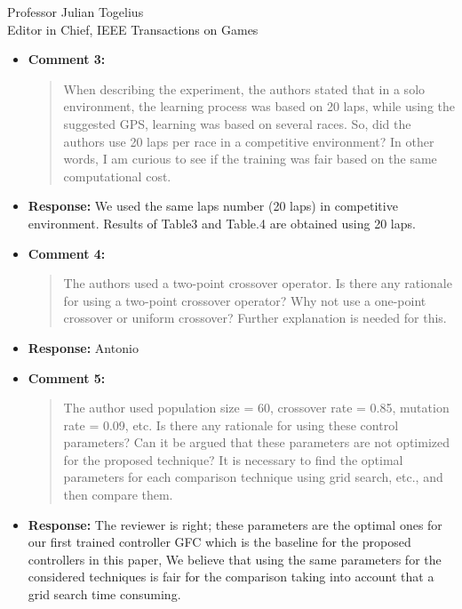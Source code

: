 \documentclass[10pt]{letter} %
\begin{document}
\begin{letter}{Professor Julian Togelius \\ Editor in Chief, IEEE Transactions on Games}
\begin{enumerate}
\begin{itemize}
\begin{itemize}
	\end{itemize}			
		\item {\bf Comment 3:}
		\begin{quote}
		When describing the experiment, the authors stated that in a solo environment, the learning process was based on 20 laps, while using the suggested GPS, learning was based on several races. So, did the authors use 20 laps per race in a competitive environment? In other words, I am curious to see if the training was fair based on the same computational cost.
			\end{quote}	
		\item {\bf Response:} 
		We used the same laps number (20 laps) in competitive environment. Results of Table3 and Table.4 are obtained using 20 laps.
		\item {\bf Comment 4:}
		\begin{quote}
The authors used a two-point crossover operator. Is there any rationale for using a two-point crossover operator? Why not use a one-point crossover or uniform crossover? Further explanation is needed for this.
			\end{quote}	
		\item {\bf Response:} 
		Antonio
		\item {\bf Comment 5:}
		\begin{quote}
The author used population size = 60, crossover rate = 0.85, mutation rate = 0.09, etc. Is there any rationale for using these control parameters? Can it be argued that these parameters are not optimized for the proposed technique? It is necessary to find the optimal parameters for each comparison technique using grid search, etc., and then compare them.
			\end{quote}	
		\item {\bf Response:} 
		The reviewer is right; these parameters are the optimal ones for our first trained controller GFC which is the baseline for the proposed controllers in this paper, We believe that using the same parameters for the considered techniques is fair for the comparison taking into account  that a grid search  time consuming. 
		

\end{itemize}
\end{enumerate}
\end{letter}
\end{document}
